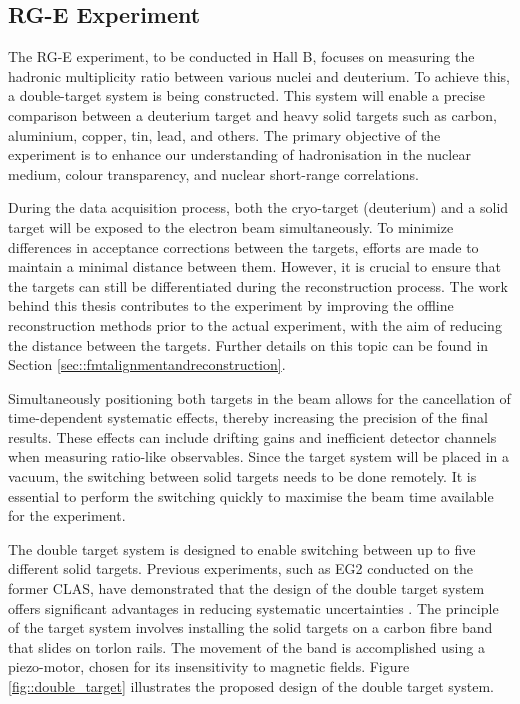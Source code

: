 \subsection{RG-E Experiment}
\label{ssec::rge_experiment}
    The RG-E experiment, to be conducted in Hall B, focuses on measuring the hadronic multiplicity ratio between various nuclei and deuterium.
    To achieve this, a double-target system is being constructed.
    This system will enable a precise comparison between a deuterium target and heavy solid targets such as carbon, aluminium, copper, tin, lead, and others.
    The primary objective of the experiment is to enhance our understanding of hadronisation in the nuclear medium, colour transparency, and nuclear short-range correlations.

    During the data acquisition process, both the cryo-target (deuterium) and a solid target will be exposed to the electron beam simultaneously.
    To minimize differences in acceptance corrections between the targets, efforts are made to maintain a minimal distance between them.
    However, it is crucial to ensure that the targets can still be differentiated during the reconstruction process.
    The work behind this thesis contributes to the experiment by improving the offline reconstruction methods prior to the actual experiment, with the aim of reducing the distance between the targets.
    Further details on this topic can be found in Section \ref{sec::fmtalignmentandreconstruction}.

    Simultaneously positioning both targets in the beam allows for the cancellation of time-dependent systematic effects, thereby increasing the precision of the final results.
    These effects can include drifting gains and inefficient detector channels when measuring ratio-like observables.
    Since the target system will be placed in a vacuum, the switching between solid targets needs to be done remotely.
    It is essential to perform the switching quickly to maximise the beam time available for the experiment.

    The double target system is designed to enable switching between up to five different solid targets.
    Previous experiments, such as EG2 conducted on the former CLAS, have demonstrated that the design of the double target system offers significant advantages in reducing systematic uncertainties \cite{hakobyan2008}.
    The principle of the target system involves installing the solid targets on a carbon fibre band that slides on torlon rails.
    The movement of the band is accomplished using a piezo-motor, chosen for its insensitivity to magnetic fields.
    Figure \ref{fig::double_target} illustrates the proposed design of the double target system.

